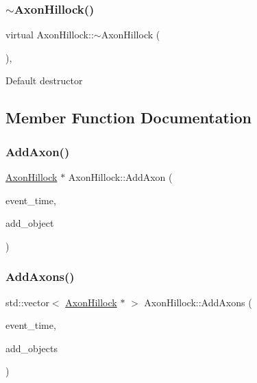 \subsubsection{\texorpdfstring{$\sim$\+Axon\+Hillock()}{~AxonHillock()}}
{\footnotesize\ttfamily virtual Axon\+Hillock\+::$\sim$\+Axon\+Hillock (\begin{DoxyParamCaption}{ }\end{DoxyParamCaption})\hspace{0.3cm}{\ttfamily [inline]}, {\ttfamily [virtual]}}

Default destructor 

\subsection{Member Function Documentation}
\mbox{\label{classAxonHillock_a02bfbaea9ea7a160933f8500c8b41d6a}} 
\subsubsection{\texorpdfstring{Add\+Axon()}{AddAxon()}}
{\footnotesize\ttfamily \mbox{\hyperlink{classAxonHillock}{Axon\+Hillock}} $\ast$ Axon\+Hillock\+::\+Add\+Axon (\begin{DoxyParamCaption}\item[{std\+::chrono\+::time\+\_\+point$<$ \mbox{\hyperlink{universe_8h_a0ef8d951d1ca5ab3cfaf7ab4c7a6fd80}{Clock}} $>$}]{event\+\_\+time,  }\item[{\mbox{\hyperlink{classAxonHillock}{Axon\+Hillock}} $\ast$}]{add\+\_\+object }\end{DoxyParamCaption})}

\mbox{\label{classAxonHillock_a54a82227b96757f1c0d7450df6a3df37}} 
\subsubsection{\texorpdfstring{Add\+Axons()}{AddAxons()}}
{\footnotesize\ttfamily std\+::vector$<$ \mbox{\hyperlink{classAxonHillock}{Axon\+Hillock}} $\ast$ $>$ Axon\+Hillock\+::\+Add\+Axons (\begin{DoxyParamCaption}\item[{std\+::chrono\+::time\+\_\+point$<$ \mbox{\hyperlink{universe_8h_a0ef8d951d1ca5ab3cfaf7ab4c7a6fd80}{Clock}} $>$}]{event\+\_\+time,  }\item[{std\+::vector$<$ \mbox{\hyperlink{classAxonHillock}{Axon\+Hillock}} $\ast$$>$}]{add\+\_\+objects }\end{DoxyParamCaption})}

